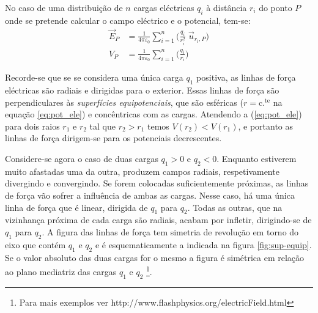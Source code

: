 \documentclass[a4paper,twoside,12pt]{article}      %
\begin{document}
No caso de uma distribuição de $n$ cargas eléctricas $q_i$ à distância $r_i$ do ponto $P$ onde se pretende calcular o campo eléctrico e o potencial, tem-se:
\begin{align}
	\vec{E}_P &= \frac{1}{4 \pi \varepsilon_0 } \sum_{i=1}^n \Big( \frac{q_i}{ r_i^2}\; \vec{u}_{r_i , P}  \Big) \nonumber \\ 
 V_P &= \frac{1}{4 \pi \varepsilon_0 } \sum_{i=1}^n \Big( \frac{q_i}{ r_i}  \Big) \nonumber
\end{align}



Recorde-se que se se considera uma única carga $q_1$ positiva, as linhas de força eléctricas são radiais e dirigidas para o exterior. Essas linhas de força são perpendiculares às \emph{superfícies equipotenciais}, que são esféricas ($r = \mathrm{c.^{te}}$ na equação \ref{eq:pot_ele}) e concêntricas com as cargas. Atendendo a (\ref{eq:pot_ele}) para dois raios $r_1$ e $r_2$ tal que $r_2 > r_1$ temos $V(r_2) < V(r_1)$, e portanto as linhas de força dirigem-se para os potenciais decrescentes.

Considere-se agora o caso de duas cargas $q_1 > 0$ e $q_2 < 0$. Enquanto estiverem muito afastadas uma da outra, produzem campos radiais, respetivamente divergindo e convergindo. Se forem colocadas suficientemente próximas, as linhas de força vão sofrer a influência de ambas as cargas. Nesse caso, há uma única linha de força que é linear, dirigida de $q_1$ para $q_2$. Todas as outras, que na vizinhança próxima de cada carga são radiais, acabam por infletir, dirigindo-se de $q_1$ para $q_2$. A figura das linhas de força tem simetria de revolução em torno do eixo que contém $q_1$ e $q_2$ e é esquematicamente a indicada na figura \ref{fig:sup-equip}. Se o valor absoluto das duas cargas for o mesmo a figura é simétrica em relação ao plano mediatriz das cargas $q_1$ e $q_2$ \footnote{Para mais exemplos ver http://www.flashphysics.org/electricField.html}.
\end{document}
